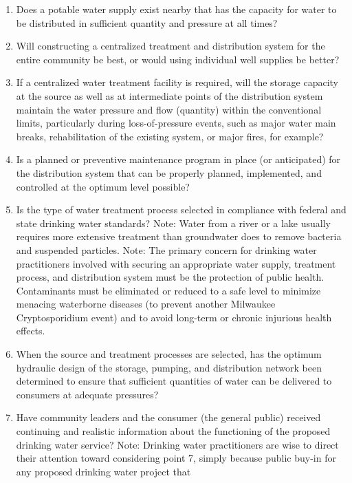 \documentclass{article}
\begin{document}
\begin{enumerate}
\def\labelenumi{\arabic{enumi}.}
\item
  Does a potable water supply exist nearby that has the capacity for
  water to be distributed in sufficient quantity and pressure at all
  times?
\item
  Will constructing a centralized treatment and distribution system for
  the entire community be best, or would using individual well supplies
  be better?
\item
  If a centralized water treatment facility is required, will the
  storage capacity at the source as well as at intermediate points of
  the distribution system maintain the water pressure and flow
  (quantity) within the conventional limits, particularly during
  loss-of-pressure events, such as major water main breaks,
  rehabilitation of the existing system, or major fires, for example?
\item
  Is a planned or preventive maintenance program in place (or
  anticipated) for the distribution system that can be properly planned,
  implemented, and controlled at the optimum level possible?
\item
  Is the type of water treatment process selected in compliance with
  federal and state drinking water standards? Note: Water from a river
  or a lake usually requires more extensive treatment than groundwater
  does to remove bacteria and suspended particles. Note: The primary
  concern for drinking water practitioners involved with securing an
  appropriate water supply, treatment process, and distribution system
  must be the protection of public health. Contaminants must be
  eliminated or reduced to a safe level to minimize menacing waterborne
  diseases (to prevent another Milwaukee Cryptosporidium event) and to
  avoid long-term or chronic injurious health effects.
\item
  When the source and treatment processes are selected, has the optimum
  hydraulic design of the storage, pumping, and distribution network
  been determined to ensure that sufficient quantities of water can be
  delivered to consumers at adequate pressures?
\item
  Have community leaders and the consumer (the general public) received
  continuing and realistic information about the functioning of the
  proposed drinking water service? Note: Drinking water practitioners
  are wise to direct their attention toward considering point 7, simply
  because public buy-in for any proposed drinking water project that

\end{enumerate}
\end{document}
